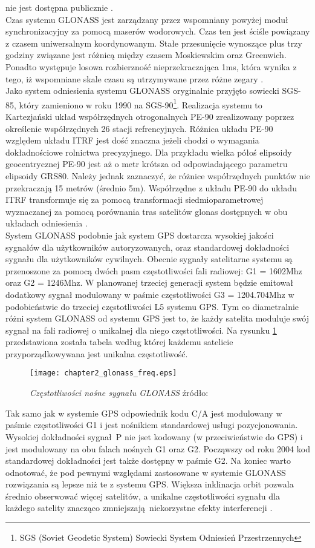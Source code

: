 nie jest dostępna publicznie \cite[][strona 353]{hofmann_gnss}.\\
\indent Czas systemu GLONASS jest zarządzany przez wspomniany powyżej moduł synchronizacyjny za pomocą maserów wodorowych. Czas ten jest ściśle powiązany z czasem uniwersalnym 
koordynowanym. Stałe przesunięcie wynoszące plus trzy godziny związane jest różnicą między czasem Moskiewskim oraz Greenwich. Ponadto występuje losowa 
rozbierzność nieprzekraczająca 1ms, która wynika z tego, iż wspomniane skale czasu są utrzymywane przez różne zegary \cite[][strona 346]{hofmann_gnss}.\\
\indent Jako system odniesienia systemu GLONASS oryginalnie przyjęto sowiecki SGS-85, który zamieniono w roku 1990 na SGS-90\footnote{ SGS (Soviet Geodetic System) Sowiecki 
System Odniesień Przestrzennych}. Realizacja systemu to Kartezjański układ współrzędnych otrogonalnych PE-90 zrealizowany poprzez określenie współrzędnych 26 stacji 
refrencyjnych. Różnica układu PE-90 względem układu ITRF jest dość znaczna jeżeli chodzi o wymagania dokładnościowe rolnictwa precyzyjnego.
Dla przykładu wielka półoś elipsoidy geocentrycznej PE-90 jest aż o metr krótsza od odpowiadającego parametru elipsoidy GRS80. Należy jednak zaznaczyć, że 
różnice współrzędnych punktów nie przekraczają 15 metrów (średnio 5m).
Współrzędne z układu PE-90 do układu ITRF transformuje się za pomocą transformacji siedmioparametrowej wyznaczanej za
pomocą porównania tras satelitów glonas dostępnych w obu układach odniesienia \cite[]{WGS84_PZ90}.\\
\indent System GLONASS podobnie jak system GPS dostarcza wysokiej jakości sygnałów dla użytkowników autoryzowanych, oraz standardowej dokładności sygnału 
dla użytkowników cywilnych. Obecnie sygnały satelitarne systemu są przenoszone za pomocą dwóch pasm częstotliwości fali radiowej: G1 = 1602Mhz oraz G2 = 1246Mhz.
W planowanej trzeciej generacji system będzie emitował dodatkowy sygnał modulowany w paśmie częstotliwości G3 = 1204.704Mhz w podobieństwie do trzeciej częstotliwości L5 
systemu GPS. Tym co diametralnie różni system GLONASS od systemu GPS jest to, że każdy satelita moduluje swój sygnał na fali radiowej o unikalnej dla niego częstotliwości.
Na rysunku \ref{fig:glonas_freq} przedstawiona została tabela według której każdemu satelicie przyporządkowywana jest unikalna częstotliwość.
\begin{figure}[H]
\centering
\texttt{[image: chapter2\_glonass\_freq.eps]}
\caption{\textit{Częstotliwości nośne sygnału GLONASS} źródło: \cite[][strona 357]{hofmann_gnss}}
\label{fig:glonas_freq}
\end{figure}
Tak samo jak w systemie GPS odpowiednik kodu C/A jest modulowany w paśmie częstotliwości G1 i jest nośnikiem standardowej usługi pozycjonowania.
Wysokiej dokładności sygnał P nie jset kodowany (w przeciwieństwie do GPS) i jest modulowany na obu falach nośnych G1 oraz G2. Począwszy od roku 2004 
kod standardowej dokładności jest także dostępny w paśmie G2. Na koniec warto odnotować, że pod pewnymi względami zastosowane w systemie GLONASS rozwiązania 
są lepsze niż te z systemu GPS. Większa inklinacja orbit pozwala średnio obserwować więcej satelitów, a unikalne częstotliwości sygnału dla każdego satelity 
znacząco zmniejszają niekorzystne efekty interferencji \cite[][strona 355]{hofmann_gnss}.
